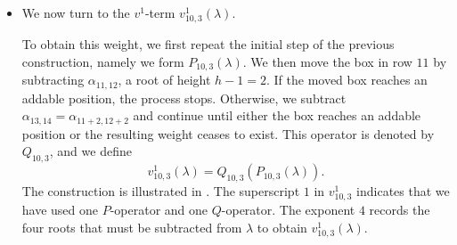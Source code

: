 \begin{itemize}
\begin{figure}[h]
\caption{The leftmost diagram represents the partition $\lambda$, while the rightmost one corresponds to $\mathbf{P}_{10,3}(\lambda)$. 
Each intermediate diagram is obtained from the previous one by applying the operator displayed between them.}
    \label{fig:introA}
\end{figure}

\item We now turn to the $v^1$-term $v^1_{10,3}(\lambda)$.

To obtain this weight, we first repeat the initial step of the previous construction, namely we form $P_{10,3}(\lambda)$. We then move the box in row $11$ by subtracting $\alpha_{11,12}$, a root of height $h-1=2$. If the moved box reaches an addable position, the process stops. Otherwise, we subtract $\alpha_{13,14}=\alpha_{11+2,12+2}$ and continue until either the box reaches an addable position or the resulting weight ceases to exist. This operator is denoted by $Q_{10,3}$, and we define
\begin{equation}
v^1_{10,3}(\lambda)=Q_{10,3}(P_{10,3}(\lambda)).
\end{equation}
The construction is illustrated in . The superscript $1$ in $v^1_{10,3}$ indicates that we have used one $P$-operator and one $Q$-operator. The exponent $4$ records the four roots that must be subtracted from $\lambda$ to obtain $v^1_{10,3}(\lambda)$.
\begin{figure}[h]
    \centering
    \Yboxdim{1cm}
\end{figure}
\end{itemize}
